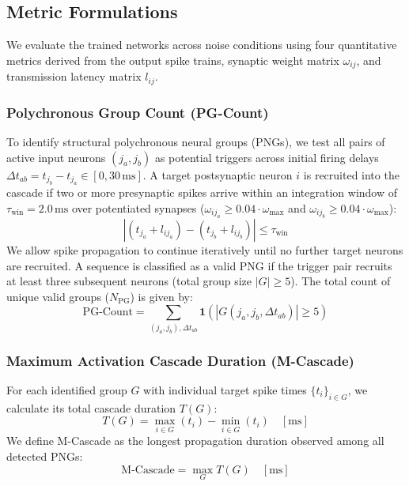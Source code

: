 
\subsection{Metric Formulations}
\label{sec:metric_formulations}

We evaluate the trained networks across noise conditions using four quantitative metrics derived from the output spike trains, synaptic weight matrix $\omega_{ij}$, and transmission latency matrix $l_{ij}$.

\subsubsection{Polychronous Group Count (PG-Count)}
To identify structural polychronous neural groups (PNGs), we test all pairs of active input neurons $(j_a, j_b)$ as potential triggers across initial firing delays $\Delta t_{ab} = t_{j_b} - t_{j_a} \in [0, 30\,\text{ms}]$. A target postsynaptic neuron $i$ is recruited into the cascade if two or more presynaptic spikes arrive within an integration window of $\tau_{\text{win}} = 2.0\,\text{ms}$ over potentiated synapses ($\omega_{i j_a} \ge 0.04 \cdot \omega_{\max}$ and $\omega_{i j_b} \ge 0.04 \cdot \omega_{\max}$):
\begin{equation}
| (t_{j_a} + l_{i j_a}) - (t_{j_b} + l_{i j_b}) | \le \tau_{\text{win}}
\end{equation}
We allow spike propagation to continue iteratively until no further target neurons are recruited. A sequence is classified as a valid PNG if the trigger pair recruits at least three subsequent neurons (total group size $|G| \ge 5$). The total count of unique valid groups ($N_{\text{PG}}$) is given by:
\begin{equation}
\text{PG-Count} = \sum_{(j_a, j_b), \Delta t_{ab}} \mathbf{1}\left(|G(j_a, j_b, \Delta t_{ab})| \ge 5\right)
\end{equation}

\subsubsection{Maximum Activation Cascade Duration (M-Cascade)}
For each identified group $G$ with individual target spike times $\{t_i\}_{i \in G}$, we calculate its total cascade duration $T(G)$:
\begin{equation}
T(G) = \max_{i \in G}(t_i) - \min_{i \in G}(t_i) \quad [\text{ms}]
\end{equation}
We define M-Cascade as the longest propagation duration observed among all detected PNGs:
\begin{equation}
\text{M-Cascade} = \max_{G} T(G) \quad [\text{ms}]
\end{equation}

